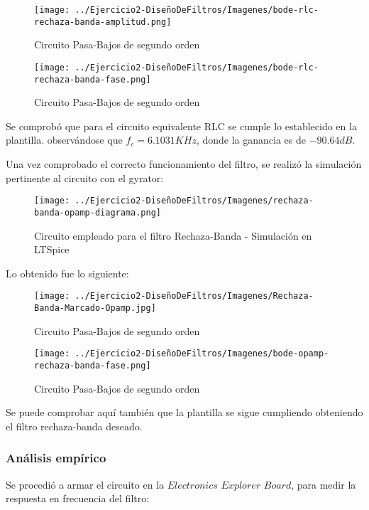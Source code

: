 \begin{figure}[H]
    \centering
    \texttt{[image: ../Ejercicio2-DiseñoDeFiltros/Imagenes/bode-rlc-rechaza-banda-amplitud.png]}
    \caption{Circuito Pasa-Bajos de segundo orden}
\end{figure}

\begin{figure}[H]
    \centering
    \texttt{[image: ../Ejercicio2-DiseñoDeFiltros/Imagenes/bode-rlc-rechaza-banda-fase.png]}
    \caption{Circuito Pasa-Bajos de segundo orden}
\end{figure}

Se comprobó que para el circuito equivalente RLC  se cumple lo establecido en la plantilla.
observándose que $f_c=6.1031 KHz$, donde la ganancia es de $-90.64 dB$.

Una vez comprobado el correcto funcionamiento del filtro, se realizó la simulación pertinente al circuito
con el gyrator:

\begin{figure}[H]
    \centering
    \texttt{[image: ../Ejercicio2-DiseñoDeFiltros/Imagenes/rechaza-banda-opamp-diagrama.png]}
    \caption{Circuito empleado para el filtro Rechaza-Banda - Simulación en LTSpice}
\end{figure}

Lo obtenido fue lo siguiente:

\begin{figure}[H]
    \centering
    \texttt{[image: ../Ejercicio2-DiseñoDeFiltros/Imagenes/Rechaza-Banda-Marcado-Opamp.jpg]}
    \caption{Circuito Pasa-Bajos de segundo orden}
\end{figure}

\begin{figure}[H]
    \centering
    \texttt{[image: ../Ejercicio2-DiseñoDeFiltros/Imagenes/bode-opamp-rechaza-banda-fase.png]}
    \caption{Circuito Pasa-Bajos de segundo orden}
\end{figure}

Se puede comprobar aquí también que la plantilla se sigue cumpliendo obteniendo el filtro rechaza-banda deseado.

\subsubsection{Análisis empírico}

Se procedió a armar el circuito en la $Electronics$ $Explorer$ $Board$, para medir la respuesta en frecuencia del filtro:

